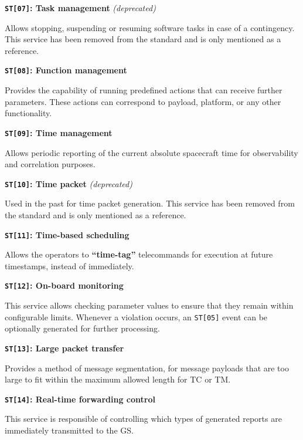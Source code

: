 \documentclass[a4paper,nobib,final]{tufte-book}
\begin{document}
\begin{compactitem}
	\item \textbf{\texttt{ST[07]}: Task management} \emph{(deprecated)}
	
	Allows stopping, suspending or resuming software tasks in case of a contingency. This service has been removed from the standard and is only mentioned as a reference.
	
	\item \textbf{\texttt{ST[08]}: Function management}
	
	Provides the capability of running predefined actions that can receive further parameters. These actions can correspond to payload, platform, or any other functionality.
	
	\pagebreak[4] %
	\item \textbf{\texttt{ST[09]}: Time management}
	
	Allows periodic reporting of the current absolute spacecraft time for observability and correlation purposes.
	
	\item \textbf{\texttt{ST[10]}: Time packet} \emph{(deprecated)}
	
	Used in the past for time packet generation. This service has been removed from the standard and is only mentioned as a reference.
	
	\item \textbf{\texttt{ST[11]}: Time-based scheduling}
	
	Allows the operators to \textbf{``time-tag''} telecommands for execution at future timestamps, instead of immediately.
	
	\item \textbf{\texttt{ST[12]}: On-board monitoring}
	
	This service allows checking parameter values to ensure that they remain within configurable limits. Whenever a violation occurs, an \texttt{ST[05]} event can be optionally generated for further processing.
	
	\item \textbf{\texttt{ST[13]}: Large packet transfer}
	
	Provides a method of message segmentation, for message payloads that are too large to fit within the maximum allowed length for \ac{TC} or \ac{TM}.
	
	\item \textbf{\texttt{ST[14]}: Real-time forwarding control}
	
	This service is responsible of controlling which types of generated reports are immediately transmitted to the \acl{GS}.
	

\end{compactitem}
\end{document}
